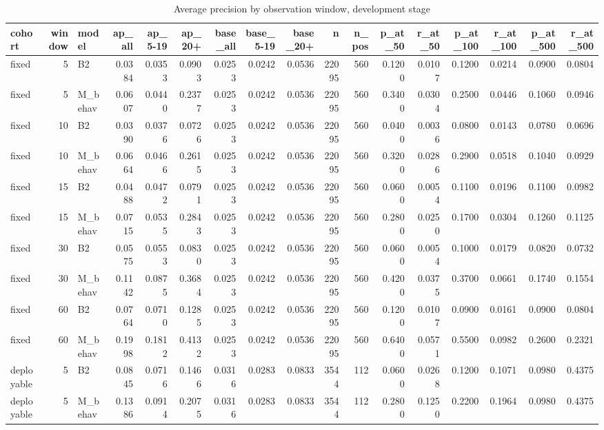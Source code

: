 \begin{table}
\caption{Average precision by observation window, development stage}
\label{tab:tab_latency_dev}
\begin{tabular}{lrlrrrrrrrrrrrrrr}
\toprule
cohort & window & model & ap\_all & ap\_5-19 & ap\_20+ & base\_all & base\_5-19 & base\_20+ & n & n\_pos & p\_at\_50 & r\_at\_50 & p\_at\_100 & r\_at\_100 & p\_at\_500 & r\_at\_500 \\
\midrule
fixed & 5 & B2 & 0.0384 & 0.0353 & 0.0903 & 0.0253 & 0.0242 & 0.0536 & 22095 & 560 & 0.1200 & 0.0107 & 0.1200 & 0.0214 & 0.0900 & 0.0804 \\
fixed & 5 & M\_behav & 0.0607 & 0.0440 & 0.2377 & 0.0253 & 0.0242 & 0.0536 & 22095 & 560 & 0.3400 & 0.0304 & 0.2500 & 0.0446 & 0.1060 & 0.0946 \\
fixed & 10 & B2 & 0.0390 & 0.0376 & 0.0726 & 0.0253 & 0.0242 & 0.0536 & 22095 & 560 & 0.0400 & 0.0036 & 0.0800 & 0.0143 & 0.0780 & 0.0696 \\
fixed & 10 & M\_behav & 0.0664 & 0.0466 & 0.2615 & 0.0253 & 0.0242 & 0.0536 & 22095 & 560 & 0.3200 & 0.0286 & 0.2900 & 0.0518 & 0.1040 & 0.0929 \\
fixed & 15 & B2 & 0.0488 & 0.0472 & 0.0791 & 0.0253 & 0.0242 & 0.0536 & 22095 & 560 & 0.0600 & 0.0054 & 0.1100 & 0.0196 & 0.1100 & 0.0982 \\
fixed & 15 & M\_behav & 0.0715 & 0.0535 & 0.2843 & 0.0253 & 0.0242 & 0.0536 & 22095 & 560 & 0.2800 & 0.0250 & 0.1700 & 0.0304 & 0.1260 & 0.1125 \\
fixed & 30 & B2 & 0.0575 & 0.0553 & 0.0830 & 0.0253 & 0.0242 & 0.0536 & 22095 & 560 & 0.0600 & 0.0054 & 0.1000 & 0.0179 & 0.0820 & 0.0732 \\
fixed & 30 & M\_behav & 0.1142 & 0.0875 & 0.3684 & 0.0253 & 0.0242 & 0.0536 & 22095 & 560 & 0.4200 & 0.0375 & 0.3700 & 0.0661 & 0.1740 & 0.1554 \\
fixed & 60 & B2 & 0.0764 & 0.0710 & 0.1285 & 0.0253 & 0.0242 & 0.0536 & 22095 & 560 & 0.1200 & 0.0107 & 0.0900 & 0.0161 & 0.0900 & 0.0804 \\
fixed & 60 & M\_behav & 0.1998 & 0.1812 & 0.4132 & 0.0253 & 0.0242 & 0.0536 & 22095 & 560 & 0.6400 & 0.0571 & 0.5500 & 0.0982 & 0.2600 & 0.2321 \\
deployable & 5 & B2 & 0.0845 & 0.0716 & 0.1466 & 0.0316 & 0.0283 & 0.0833 & 3544 & 112 & 0.0600 & 0.0268 & 0.1200 & 0.1071 & 0.0980 & 0.4375 \\
deployable & 5 & M\_behav & 0.1386 & 0.0914 & 0.2075 & 0.0316 & 0.0283 & 0.0833 & 3544 & 112 & 0.2800 & 0.1250 & 0.2200 & 0.1964 & 0.0980 & 0.4375 \\

\end{tabular}
\end{table}
